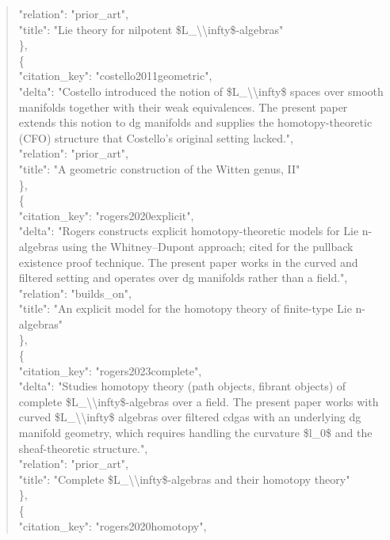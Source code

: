 \documentclass[11pt]{article}
\begin{document}
\begin{quote}
      "relation": "prior\_art",\\
      "title": "Lie theory for nilpotent \$L\_\textbackslash{}\textbackslash{}infty\$-algebras"\\
    \},\\
    \{\\
      "citation\_key": "costello2011geometric",\\
      "delta": "Costello introduced the notion of \$L\_\textbackslash{}\textbackslash{}infty\$ spaces over smooth manifolds together with their weak equivalences. The present paper extends this notion to dg manifolds and supplies the homotopy-theoretic (CFO) structure that Costello's original setting lacked.",\\
      "relation": "prior\_art",\\
      "title": "A geometric construction of the Witten genus, II"\\
    \},\\
    \{\\
      "citation\_key": "rogers2020explicit",\\
      "delta": "Rogers constructs explicit homotopy-theoretic models for Lie n-algebras using the Whitney--Dupont approach; cited for the pullback existence proof technique. The present paper works in the curved and filtered setting and operates over dg manifolds rather than a field.",\\
      "relation": "builds\_on",\\
      "title": "An explicit model for the homotopy theory of finite-type Lie n-algebras"\\
    \},\\
    \{\\
      "citation\_key": "rogers2023complete",\\
      "delta": "Studies homotopy theory (path objects, fibrant objects) of complete \$L\_\textbackslash{}\textbackslash{}infty\$-algebras over a field. The present paper works with curved \$L\_\textbackslash{}\textbackslash{}infty\$ algebras over filtered cdgas with an underlying dg manifold geometry, which requires handling the curvature \$l\_0\$ and the sheaf-theoretic structure.",\\
      "relation": "prior\_art",\\
      "title": "Complete \$L\_\textbackslash{}\textbackslash{}infty\$-algebras and their homotopy theory"\\
    \},\\
    \{\\
      "citation\_key": "rogers2020homotopy",\\

\end{quote}
\end{document}
